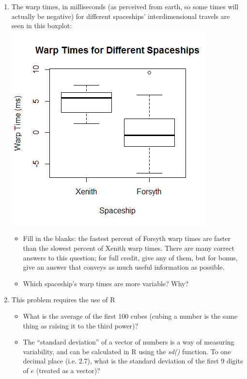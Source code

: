 \documentclass[12pt]{article}
\begin{document}
\begin{enumerate}[itemsep=-1ex]
	\newpage
\item The warp times, in milliseconds (as perceived from earth, so some times will actually be negative) for different spaceships' interdimensional travels are seen in this boxplot: \includegraphics[scale=0.8]{boxplot} 
	\begin{itemize}
		\item Fill in the blanks: the fastest \qquad percent of Forsyth warp times are faster than the slowest \qquad percent of Xenith warp times. There are many correct answers to this question; for full credit, give any of them, but for bonus, give an answer that conveys as much useful information as possible.
		\item Which spaceship's warp times are more variable? Why? \vspace{10mm}
	\end{itemize}

	\item This problem requires the use of R
	\begin{itemize}
		\item What is the average of the first 100 cubes (cubing a number is the same thing as raising it to the third power)? \vspace{5mm}
		\item The ``standard deviation'' of a vector of numbers is a way of measuring variability, and can be calculated in R using the \textit{sd()} function. To one decimal place (i.e. 2.7), what is the standard deviation of the first 9 digits of $e$ (treated as a vector)? 
	\end{itemize}


\end{enumerate}
\end{document}
